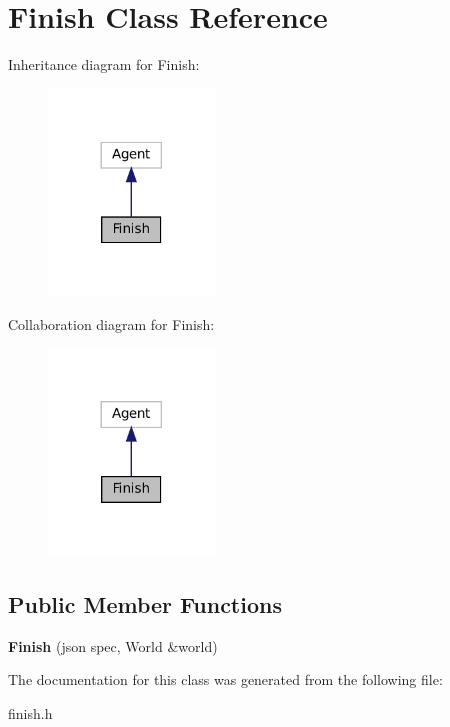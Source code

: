 \hypertarget{classFinish}{}\section{Finish Class Reference}
\label{classFinish}


Inheritance diagram for Finish\+:
\nopagebreak
\begin{figure}[H]
\begin{center}
\leavevmode
\includegraphics[width=125pt]{classFinish__inherit__graph}
\end{center}
\end{figure}


Collaboration diagram for Finish\+:
\nopagebreak
\begin{figure}[H]
\begin{center}
\leavevmode
\includegraphics[width=125pt]{classFinish__coll__graph}
\end{center}
\end{figure}
\subsection*{Public Member Functions}
\begin{DoxyCompactItemize}
\item 
\mbox{\label{classFinish_a22401ebe02f7822a86048e25e95114e8}} 
{\bfseries Finish} (json spec, World \&world)
\end{DoxyCompactItemize}


The documentation for this class was generated from the following file\+:\begin{DoxyCompactItemize}
\item 
finish.\+h\end{DoxyCompactItemize}
